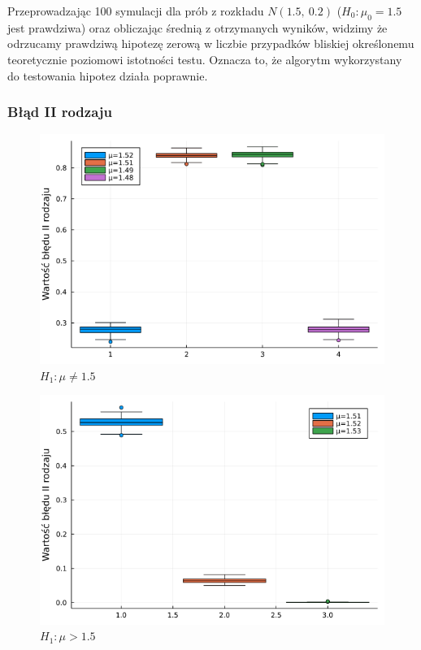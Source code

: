 \documentclass{article}
\theoremstyle{break}
\begin{document}
Przeprowadzając 100 symulacji dla prób z rozkładu $N(1.5,~0.2)$ ($H_0: \mu_0 = 1.5$ jest prawdziwa) oraz obliczając średnią z otrzymanych wyników, widzimy że odrzucamy prawdziwą hipotezę zerową w liczbie przypadków bliskiej określonemu teoretycznie poziomowi istotności testu. Oznacza to, że algorytm wykorzystany do testowania hipotez działa poprawnie.

\subsubsection*{Błąd II rodzaju}
\begin{figure}[H]
	\begin{center}
		\includegraphics[scale=0.5]{Z3.mu1.png}
		\caption{$H_1: \mu\ne1.5$}
	\end{center}
\end{figure}
\begin{figure}[H]
	\begin{center}
		\includegraphics[scale=0.5]{Z3.mu2.png}
		\caption{$H_1: \mu>1.5$}
	\end{center}
\end{figure}
\end{document}

